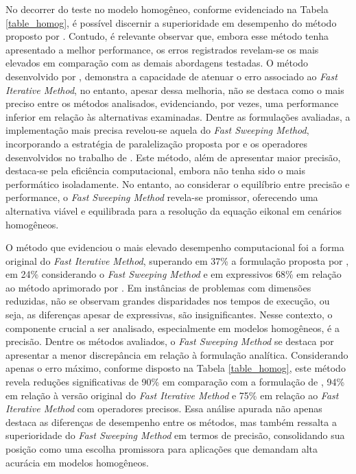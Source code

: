 No decorrer do teste no modelo homogêneo, conforme evidenciado na Tabela \ref{table_homog}, é possível discernir a superioridade em desempenho do método proposto por . Contudo, é relevante observar que, embora esse método tenha apresentado a melhor performance, os erros registrados revelam-se os mais elevados em comparação com as demais abordagens testadas. O método desenvolvido por , demonstra a capacidade de atenuar o erro associado ao \textit{Fast Iterative Method}, no entanto, apesar dessa melhoria, não se destaca como o mais preciso entre os métodos analisados, evidenciando, por vezes, uma performance inferior em relação às alternativas examinadas. Dentre as formulações avaliadas, a implementação mais precisa revelou-se aquela do \textit{Fast Sweeping Method}, incorporando a estratégia de paralelização proposta por  e os operadores desenvolvidos no trabalho de . Este método, além de apresentar maior precisão, destaca-se pela eficiência computacional, embora não tenha sido o mais performático isoladamente. No entanto, ao considerar o equilíbrio entre precisão e performance, o \textit{Fast Sweeping Method} revela-se promissor, oferecendo uma alternativa viável e equilibrada para a resolução da equação eikonal em cenários homogêneos. 

O método que evidenciou o mais elevado desempenho computacional foi a forma original do \textit{Fast Iterative Method}, superando em 37\% a formulação proposta por , em 24\% considerando o \textit{Fast Sweeping Method} e em expressivos 68\% em relação ao método aprimorado por . Em instâncias de problemas com dimensões reduzidas, não se observam grandes disparidades nos tempos de execução, ou seja, as diferenças apesar de expressivas, são insignificantes. Nesse contexto, o componente crucial a ser analisado, especialmente em modelos homogêneos, é a precisão. Dentre os métodos avaliados, o \textit{Fast Sweeping Method} se destaca por apresentar a menor discrepância em relação à formulação analítica. Considerando apenas o erro máximo, conforme disposto na Tabela \ref{table_homog}, este método revela reduções significativas de 90\% em comparação com a formulação de , 94\% em relação à versão original do \textit{Fast Iterative Method} e 75\% em relação ao \textit{Fast Iterative Method} com operadores precisos. Essa análise apurada não apenas destaca as diferenças de desempenho entre os métodos, mas também ressalta a superioridade do \textit{Fast Sweeping Method} em termos de precisão, consolidando sua posição como uma escolha promissora para aplicações que demandam alta acurácia em modelos homogêneos.

